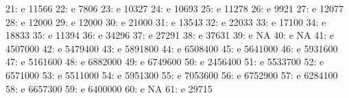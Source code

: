 \documentclass[nojss]{jss}
\begin{document}
\begin{Schunk}
\begin{Soutput}
 21:                               e                      11566
 22:                               e                       7806
 23:                               e                      10327
 24:                               e                      10693
 25:                               e                      11278
 26:                               e                       9921
 27:                               e                      12077
 28:                               e                      12000
 29:                               e                      12000
 30:                               e                      21000
 31:                               e                      13543
 32:                               e                      22033
 33:                               e                      17100
 34:                               e                      18833
 35:                               e                      11394
 36:                               e                      34296
 37:                               e                      27291
 38:                               e                      37631
 39:                               e                         NA
 40:                               e                         NA
 41:                               e                    4507000
 42:                               e                    5479400
 43:                               e                    5891800
 44:                               e                    6508400
 45:                               e                    5641000
 46:                               e                    5931600
 47:                               e                    5161600
 48:                               e                    6882000
 49:                               e                    6749600
 50:                               e                    2456400
 51:                               e                    5533700
 52:                               e                    6571000
 53:                               e                    5511000
 54:                               e                    5951300
 55:                               e                    7053600
 56:                               e                    6752900
 57:                               e                    6284100
 58:                               e                    6657300
 59:                               e                    6400000
 60:                               e                         NA
 61:                               e                      29715

\end{Soutput}
\end{Schunk}
\end{document}
